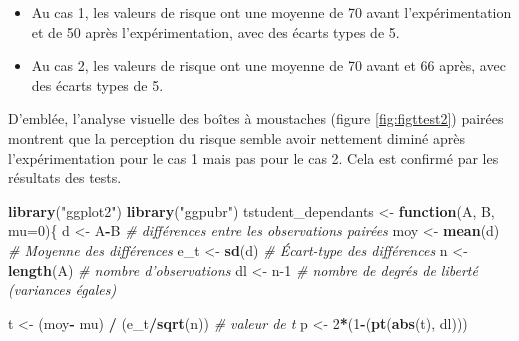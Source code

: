 \documentclass[
  11pt,
  french,
]{book}
\makeatletter
\newenvironment{Shaded}{\begin{snugshade}}{\end{snugshade}}
\newcommand{\CommentTok}[1]{\textcolor[rgb]{0.56,0.35,0.01}{\textit{#1}}}
\newcommand{\ControlFlowTok}[1]{\textcolor[rgb]{0.13,0.29,0.53}{\textbf{#1}}}
\newcommand{\DataTypeTok}[1]{\textcolor[rgb]{0.13,0.29,0.53}{#1}}
\newcommand{\DecValTok}[1]{\textcolor[rgb]{0.00,0.00,0.81}{#1}}
\newcommand{\KeywordTok}[1]{\textcolor[rgb]{0.13,0.29,0.53}{\textbf{#1}}}
\newcommand{\NormalTok}[1]{#1}
\newcommand{\OperatorTok}[1]{\textcolor[rgb]{0.81,0.36,0.00}{\textbf{#1}}}
\newcommand{\StringTok}[1]{\textcolor[rgb]{0.31,0.60,0.02}{#1}}
\providecommand{\tightlist}{%
  \setlength{\itemsep}{0pt}\setlength{\parskip}{0pt}}
\newenvironment{kframe}{%
\medskip{}
\setlength{\fboxsep}{.8em}
 \def\at@end@of@kframe{}%
 \ifinner\ifhmode%
  \def\at@end@of@kframe{\end{minipage}}%
  \begin{minipage}{\columnwidth}%
 \fi\fi%
 \def\FrameCommand##1{\hskip\@totalleftmargin \hskip-\fboxsep
 \colorbox{shadecolor}{##1}\hskip-\fboxsep
     \hskip-\linewidth \hskip-\@totalleftmargin \hskip\columnwidth}%
 \MakeFramed {\advance\hsize-\width
   \@totalleftmargin\z@ \linewidth\hsize
   \@setminipage}}%
 {\par\unskip\endMakeFramed%
 \at@end@of@kframe}
\renewenvironment{Shaded}{\begin{kframe}}{\end{kframe}}
\makeatother
\begin{document}
\begin{itemize}
\tightlist
\item
  Au cas 1, les valeurs de risque ont une moyenne de 70 avant l'expérimentation et de 50 après l'expérimentation, avec des écarts types de 5.
\item
  Au cas 2, les valeurs de risque ont une moyenne de 70 avant et 66 après, avec des écarts types de 5.
\end{itemize}

D'emblée, l'analyse visuelle des boîtes à moustaches (figure \ref{fig:figttest2}) pairées montrent que la perception du risque semble avoir nettement diminé après l'expérimentation pour le cas 1 mais pas pour le cas 2. Cela est confirmé par les résultats des tests.

\begin{Shaded}
\begin{Highlighting}[]
\KeywordTok{library}\NormalTok{(}\StringTok{"ggplot2"}\NormalTok{)}
\KeywordTok{library}\NormalTok{(}\StringTok{"ggpubr"}\NormalTok{)}
\NormalTok{tstudent_dependants <-}\StringTok{ }\ControlFlowTok{function}\NormalTok{(A, B, }\DataTypeTok{mu=}\DecValTok{0}\NormalTok{)\{}
\NormalTok{  d <-}\StringTok{ }\NormalTok{A}\OperatorTok{-}\NormalTok{B           }\CommentTok{# différences entre les observations pairées}
\NormalTok{  moy <-}\StringTok{ }\KeywordTok{mean}\NormalTok{(d)     }\CommentTok{# Moyenne des différences}
\NormalTok{  e_t <-}\StringTok{ }\KeywordTok{sd}\NormalTok{(d)       }\CommentTok{# Écart-type des différences}
\NormalTok{  n   <-}\StringTok{ }\KeywordTok{length}\NormalTok{(A)   }\CommentTok{# nombre d'observations}
\NormalTok{  dl  <-}\StringTok{ }\NormalTok{n}\DecValTok{-1}         \CommentTok{# nombre de degrés de liberté (variances égales)}
  
\NormalTok{  t <-}\StringTok{ }\NormalTok{(moy}\OperatorTok{-}\StringTok{ }\NormalTok{mu) }\OperatorTok{/}\StringTok{ }\NormalTok{(e_t}\OperatorTok{/}\KeywordTok{sqrt}\NormalTok{(n)) }\CommentTok{# valeur de t}
\NormalTok{  p <-}\StringTok{  }\DecValTok{2}\OperatorTok{*}\NormalTok{(}\DecValTok{1}\OperatorTok{-}\NormalTok{(}\KeywordTok{pt}\NormalTok{(}\KeywordTok{abs}\NormalTok{(t), dl)))}
  

\end{Highlighting}
\end{Shaded}
\end{document}
